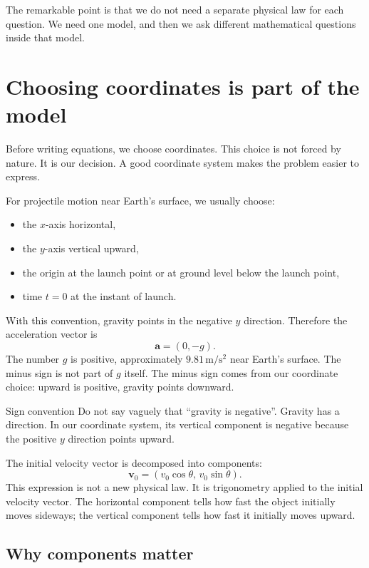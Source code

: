 \documentclass[11pt,a4paper]{article}
\newcommand{\vect}[1]{\boldsymbol{#1}}
\begin{document}
The remarkable point is that we do not need a separate physical law for each question. We need one model, and then we ask different mathematical questions inside that model.

\section{Choosing coordinates is part of the model}

Before writing equations, we choose coordinates. This choice is not forced by nature. It is our decision. A good coordinate system makes the problem easier to express.

For projectile motion near Earth's surface, we usually choose:
\begin{itemize}
    \item the $x$-axis horizontal,
    \item the $y$-axis vertical upward,
    \item the origin at the launch point or at ground level below the launch point,
    \item time $t=0$ at the instant of launch.
\end{itemize}

With this convention, gravity points in the negative $y$ direction. Therefore the acceleration vector is
\[
\vect a=(0,-g).
\]
The number $g$ is positive, approximately $9.81\,\mathrm{m/s^2}$ near Earth's surface. The minus sign is not part of $g$ itself. The minus sign comes from our coordinate choice: upward is positive, gravity points downward.

\begin{warningbox}{Sign convention}
Do not say vaguely that ``gravity is negative''. Gravity has a direction. In our coordinate system, its vertical component is negative because the positive $y$ direction points upward.
\end{warningbox}

The initial velocity vector is decomposed into components:
\[
\vect v_0=(v_0\cos\theta,\,v_0\sin\theta).
\]
This expression is not a new physical law. It is trigonometry applied to the initial velocity vector. The horizontal component tells how fast the object initially moves sideways; the vertical component tells how fast it initially moves upward.

\subsection{Why components matter}
\end{document}

